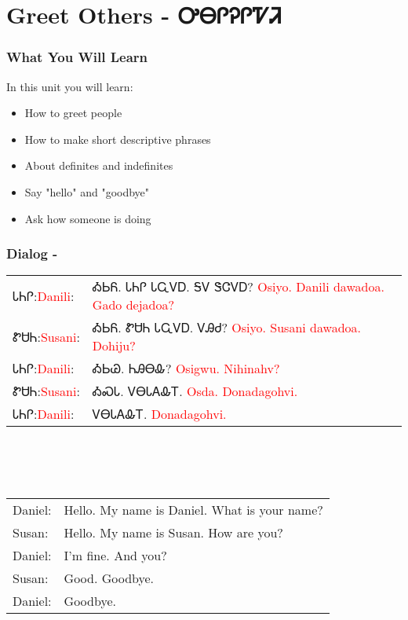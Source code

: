 \chapter{Greet Others - ᎤᎾᎵᎮᎵᏤᏘ}
\subsection{What You Will Learn}
In this unit you will learn:
\begin{itemize}
\item How to greet people
\item How to make short descriptive phrases
\item About definites and indefinites
\item Say "hello" and "goodbye"
\item Ask how someone is doing
\end{itemize}\newpage

\subsection{Dialog - }
\begin{tabular}{p{2cm} p{11cm}}
ᏓᏂᎵ:\newline \textcolor{red}{Danili}: & ᎣᏏᏲ.  ᏓᏂᎵ ᏓᏩᏙᎠ.  ᎦᏙ ᏕᏣᏙᎠ? 
\newline\textcolor{red}{Osiyo.  Danili dawadoa.  Gado dejadoa?}\\
ᏑᏌᏂ:\newline \textcolor{red}{Susani}: & ᎣᏏᏲ.  ᏑᏌᏂ ᏓᏩᏙᎠ.  ᏙᎯᏧ? 
\newline\textcolor{red}{Osiyo.  Susani dawadoa.  Dohiju?}\\
ᏓᏂᎵ:\newline \textcolor{red}{Danili}: & ᎣᏏᏊ.  ᏂᎯᎾᎲ? 
\newline\textcolor{red}{Osigwu.  Nihinahv?}\\
ᏑᏌᏂ:\newline \textcolor{red}{Susani}: & ᎣᏍᏓ.  ᏙᎾᏓᎪᎲᎢ. 
\newline\textcolor{red}{Osda.  Donadagohvi.}\\
ᏓᏂᎵ:\newline \textcolor{red}{Danili}: & ᏙᎾᏓᎪᎲᎢ. 
\newline\textcolor{red}{Donadagohvi.}\\
\end{tabular}
\\
\\
\\
\noindent\begin{tabular}{p{2cm} p{11cm}}Daniel: & Hello.  My name is Daniel.  What is your name?\\
Susan: & Hello.  My name is Susan.  How are you?\\
Daniel: & I'm fine.  And you?\\
Susan: & Good.  Goodbye.\\
Daniel: & Goodbye.\\
\end{tabular}
